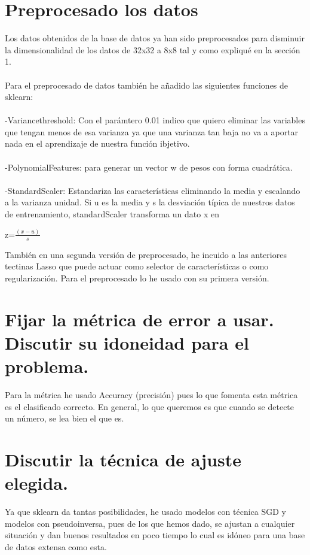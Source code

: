 \documentclass[12pt]{article}
\begin{document}
\section{Preprocesado los datos}
Los datos obtenidos de la base de datos ya han sido preprocesados para disminuir la dimensionalidad de los datos de 32x32 a 8x8 tal y como expliqué en la sección 1.\\\\
Para el preprocesado de datos también he añadido las siguientes funciones de sklearn:\\\\
-Variancethreshold: Con el parámtero 0.01 indico que quiero eliminar las variables que tengan menos de esa varianza ya que una varianza tan baja no va a aportar nada en el aprendizaje de nuestra función ibjetivo.\\\\
-PolynomialFeatures: para generar un vector w de pesos con forma cuadrática.\\\\
-StandardScaler: Estandariza las características eliminando la media y escalando a la varianza unidad. Si u es la media y s la desviación típica de nuestros datos de entrenamiento, standardScaler transforma un dato x en
\begin{center}
z=$\frac{(x-u)}{s}$
\end{center}
También en una segunda versión de preprocesado, he incuido a las anteriores tectinas Lasso que puede actuar como selector de características o como regularización. Para el preprocesado lo he usado con su primera versión.

\section{Fijar la métrica de error a usar. Discutir su idoneidad para el problema.}
Para la métrica he usado Accuracy (precisión) pues lo que fomenta esta métrica es el clasificado correcto. En general, lo que queremos es que cuando se detecte un número, se lea bien el que es.

\section{Discutir la técnica de ajuste elegida.}
Ya que sklearn da tantas posibilidades, he usado modelos con técnica SGD y modelos con pseudoinversa, pues de los que hemos dado, se ajustan a cualquier situación y dan buenos resultados en poco tiempo lo cual es idóneo para una base de datos extensa como esta.
\end{document}
